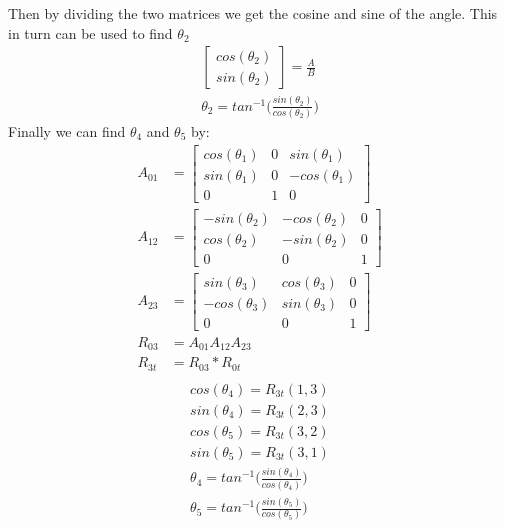 \documentclass[12pt]{article}
\begin{document}
Then by dividing the two matrices we get the cosine and sine of the angle. This in turn can be used to find $\theta_2$
\begin{align}
    \begin{bmatrix}
             cos(\theta_2)\\
             sin(\theta_2)
    \end{bmatrix}
    = \frac{A}{B}\nonumber\\
    \theta_2=tan^{-1}\bigg(\frac{sin(\theta_2)}{cos(\theta_2)}\bigg)
\end{align}
Finally we can find $\theta_4$ and $\theta_5$ by:
\begin{align*}
    A_{01} &= 
    \begin{bmatrix}
          cos(\theta_1) & 0 & sin(\theta_1)\\
          sin(\theta_1) & 0 & -cos(\theta_1)\\
          0 & 1 & 0
    \end{bmatrix}\\
    A_{12} &=
    \begin{bmatrix}
             -sin(\theta_2) & -cos(\theta_2) & 0\\
             cos(\theta_2) & -sin(\theta_2) & 0 \\
              0 & 0 & 1
    \end{bmatrix}\\
    A_{23} &=
    \begin{bmatrix}
             sin(\theta_3) & cos(\theta_3) & 0\\
             -cos(\theta_3) & sin(\theta_3) & 0 \\
              0 & 0 & 1
    \end{bmatrix}\\
    R_{03}&=A_{01}A_{12}A_{23}\\
    R_{3t}&=R_{03}*R_{0t}\\
\end{align*}
\begin{align}
    cos(\theta_4) = R_{3t}(1,3)\nonumber\\
    sin(\theta_4) = R_{3t}(2,3)\nonumber\\
    cos(\theta_5) = R_{3t}(3,2)\nonumber\\
    sin(\theta_5) = R_{3t}(3,1)\nonumber\\
    \theta_4 = tan^{-1}\bigg(\frac{sin(\theta_4)}{cos(\theta_4)}\bigg)\\
    \theta_5 = tan^{-1}\bigg(\frac{sin(\theta_5)}{cos(\theta_5)}\bigg)
\end{align}
\pagebreak
\end{document}
